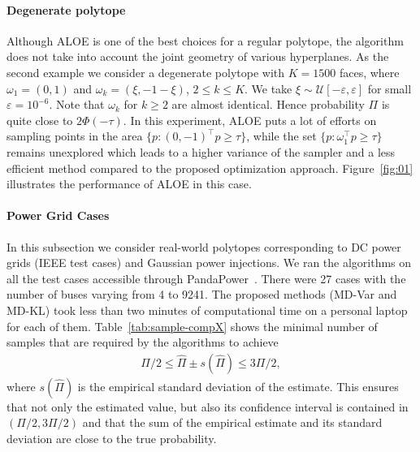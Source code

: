 \paragraph{Degenerate polytope} Although ALOE is one of the best choices for a regular polytope, the algorithm does not take into account the joint geometry of various hyperplanes. 
%
As the second example we consider a degenerate polytope with $K=1500$ faces, where $\omega_1 = (0, 1)$  and $\omega_k = (\xi, -1 - \xi)$, $2\le k \le K$. We take $\xi \sim \mathcal{U}[-\varepsilon, \varepsilon]$ for small $\varepsilon = 10^{-6}$. Note that $\omega_k$ for $k\geq 2$ are almost identical. Hence probability $\Pi$ is quite close to $2\Phi(-\tau)$. In this experiment, ALOE puts a lot of efforts on sampling points in the area $\{p: (0, -1)^\top p \ge \tau\}$, while the set $\{p: \omega_1^\top p \ge \tau\}$ remains unexplored which leads to a higher variance of the sampler and a less efficient method compared to the proposed optimization approach. Figure~\ref{fig:01} illustrates the performance of ALOE in this case. 

\paragraph{Power Grid Cases} In this subsection we consider real-world polytopes corresponding to DC power grids (IEEE test cases) and Gaussian power injections.
%
%
We ran the algorithms on all the test cases  accessible through PandaPower~\cite{pandapower.2018}. There were 27 cases with the number of buses varying from 4 to 9241. The proposed methods (MD-Var and MD-KL) took less than two minutes of computational time on a personal laptop for each of them. 
%
Table~\ref{tab:sample-compX} shows the minimal number of samples that are required by the algorithms to achieve 
\begin{align}
    \Pi/2 \le \hat\Pi \pm s(\hat\Pi) \le 3\Pi/2, \label{eq:tk}
\end{align}
where $s(\hat\Pi)$ is the empirical standard deviation of the estimate. This ensures that not only the estimated value, but also its confidence interval is contained in $(\Pi/2, 3\Pi/2)$ and that the sum of the empirical estimate and its standard deviation are close to %
the true probability. 



